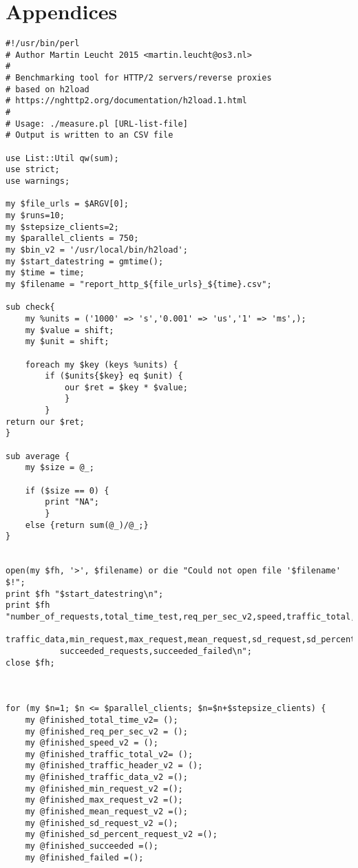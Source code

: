 \section*{Appendices}
\label{sec:appendices}


\begin{lstlisting}
#!/usr/bin/perl 
# Author Martin Leucht 2015 <martin.leucht@os3.nl>
#
# Benchmarking tool for HTTP/2 servers/reverse proxies
# based on h2load 
# https://nghttp2.org/documentation/h2load.1.html
#
# Usage: ./measure.pl [URL-list-file]
# Output is written to an CSV file

use List::Util qw(sum);
use strict;
use warnings;

my $file_urls = $ARGV[0];
my $runs=10;
my $stepsize_clients=2;
my $parallel_clients = 750;
my $bin_v2 = '/usr/local/bin/h2load';
my $start_datestring = gmtime();
my $time = time;
my $filename = "report_http_${file_urls}_${time}.csv";

sub check{
	my %units = ('1000' => 's','0.001' => 'us','1' => 'ms',);
	my $value = shift;
	my $unit = shift;
	
	foreach my $key (keys %units) {
		if ($units{$key} eq $unit) {
			our $ret = $key * $value;
			}
		}		
return our $ret;
}

sub average {
	my $size = @_;
	
	if ($size == 0) {
		print "NA";
		}
	else {return sum(@_)/@_;}
}


open(my $fh, '>', $filename) or die "Could not open file '$filename' $!";
print $fh "$start_datestring\n";
print $fh "number_of_requests,total_time_test,req_per_sec_v2,speed,traffic_total,traffic_header,
		   traffic_data,min_request,max_request,mean_request,sd_request,sd_percent_request,
		   succeeded_requests,succeeded_failed\n";
close $fh;



for (my $n=1; $n <= $parallel_clients; $n=$n+$stepsize_clients) {  
	my @finished_total_time_v2= ();
    my @finished_req_per_sec_v2 = ();
    my @finished_speed_v2 = ();
    my @finished_traffic_total_v2= ();
    my @finished_traffic_header_v2 = ();
    my @finished_traffic_data_v2 =();
    my @finished_min_request_v2 =();
    my @finished_max_request_v2 =();
    my @finished_mean_request_v2 =();
    my @finished_sd_request_v2 =();
    my @finished_sd_percent_request_v2 =();
    my @finished_succeeded =();
    my @finished_failed =();




\end{lstlisting}
